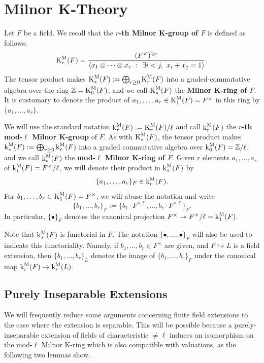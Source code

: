 \documentclass[11pt]{amsart}
\theoremstyle{definition}
\theoremstyle{remark}
\numberwithin{equation}{section}
\newcommand{\Z}{\mathbb{Z}}
\renewcommand{\k}{\operatorname{k}^{\rm M}}
\newcommand{\K}{\operatorname{K}^{\rm M}}
\begin{document}
\section{Milnor K-Theory}
\label{section: milnor}


Let $F$ be a field.
We recall that the {\bf $r$-th Milnor K-group of $F$} is defined as follows:
\[ \K_r(F) = \frac{(F^\times)^{\otimes r}}{\langle x_1 \otimes \cdots \otimes x_r \ : \ \exists i < j, \ x_i + x_j = 1 \rangle}. \]
The tensor product makes $\K_*(F) := \bigoplus_{r \geq 0} \K_r(F)$ into a graded-commutative algebra over the ring $\Z = \K_0(F)$, and we call $\K_*(F)$ the {\bf Milnor K-ring of $F$}.
It is customary to denote the product of $a_1,\ldots,a_r \in \K_1(F) = F^\times$ in this ring by $\{a_1,\ldots,a_r\}$.

We will use the standard notation $\k_r(F) := \K_r(F)/\ell$ and call $\k_r(F)$ the {\bf $r$-th mod-$\ell$ Milnor K-group} of $F$.
As with $\K_*(F)$, the tensor product makes $\k_*(F) := \bigoplus_{r \geq 0} \k_r(F)$ into a graded commutative algebra over $\k_0(F) =\Z/\ell$, and we call $\k_*(F)$ the {\bf mod-$\ell$ Milnor K-ring of $F$}.
Given $r$ elements $a_1,\ldots,a_r$ of $\k_1(F) = F^\times/\ell$, we will denote their product in $\k_*(F)$ by 
\[ \{a_1,\ldots,a_r\}_F \in \k_r(F).\]
For $b_1,\ldots,b_r \in \K_1(F) = F^\times$, we will abuse the notation and write
\[ \{b_1,\ldots,b_r\}_F := \{b_1 \cdot F^{\times \ell},\ldots,b_r \cdot F^{\times\ell}\}_F. \] 
In particular, $\{\bullet\}_F$ denotes the canonical projection $F^\times \twoheadrightarrow F^\times/\ell = \k_1(F)$.

Note that $\k_*(F)$ is functorial in $F$.
The notation $\{\bullet,\ldots,\bullet\}_F$ will also be used to indicate this functoriality.
Namely, if $b_1,\ldots,b_r \in F^\times$ are given, and $F \hookrightarrow L$ is a field extension, then $\{b_1,\ldots,b_r\}_L$ denotes the image of $\{b_1,\ldots,b_r\}_F$ under the canonical map $\k_r(F) \rightarrow \k_r(L)$.

\subsection{Purely Inseparable Extensions}
\label{subsection: milnor / insep}

We will frequently reduce some arguments concerning finite field extensions to the case where the extension is separable.
This will be possible because a purely-inseparable extension of fields of characteristic $\neq \ell$ induces an isomorphism on the mod-$\ell$ Milnor K-ring which is also compatible with valuations, as the following two lemmas show.
\end{document}
